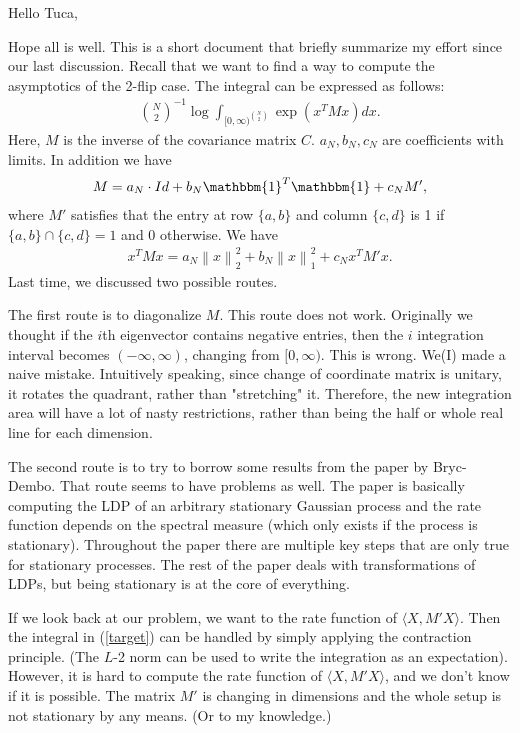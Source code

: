 \documentclass[10pt]{article}
\author{Yi Gu}
\newcommand{\norm}[1]{\left\lVert#1\right\rVert}
\newenvironment{Proof of lemma}{\noindent{\bf Proof of Lemma}}{\hfill$\Box$\newline}
\newenvironment{Proof of claim}{\noindent{\bf Proof of claim}}{\hfill$\Box$\newline}
\newenvironment{Proof of theorem}{\noindent{\bf Proof of Theorem}}{\hfill\scriptsize{$\Box$}\newline}
\newenvironment{Proof of theorems}{\noindent{\bf Proof of Theorems}}{\hfill$\Box$\newline}
\newenvironment{Proof of proposition}{\noindent{\bf Proof of Proposition}}{\hfill$\Box$\newline}
\newenvironment{Proof of propositions}{\noindent{\bf Proof of Propositions}}{\hfill$\Box$\newline}
\newenvironment{Proof of exercise}{\noindent{\it Proof of Exercise:}}{\hfill$\Box$}
\begin{document}
Hello Tuca,

Hope all is well. This is a short document that briefly summarize my effort since our last discussion. Recall that we want to find a way to compute the asymptotics of the 2-flip case. The integral can be expressed as follows:
\begin{align} \label{target}
    \binom{N}{2}^{-1}\log \int_{[0,\infty)^{\binom{N}{2}}} \exp \left(x^T M x\right)dx.
\end{align}
Here, $M$ is the inverse of the covariance matrix $C$. $a_N, b_N, c_N$ are coefficients with limits. In addition we have
\begin{align} 
    M = a_N\cdot Id + b_N \mathbbm{1}^T\mathbbm{1} + c_NM',
\end{align}
where $M'$ satisfies that the entry at row $\{a,b\}$ and column $\{c,d\}$ is 1 if $\{a,b\} \cap \{c,d\} = 1$ and 0 otherwise. We have
\begin{align}
    x^TMx = a_N\norm{x}_2^2 + b_N \norm{x}_1^2 + c_Nx^TM'x.
\end{align}
Last time, we discussed two possible routes. 

The first route is to diagonalize $M$. This route does not work. Originally we thought if the $i$th eigenvector contains negative entries, then the $i$ integration interval becomes $(-\infty,\infty)$, changing from $[0,\infty)$. This is wrong. We(I) made a naive mistake. Intuitively speaking, since change of coordinate matrix is unitary, it rotates the quadrant, rather than "stretching" it. Therefore, the new integration area will have a lot of nasty restrictions, rather than being the half or whole real line for each dimension.

The second route is to try to borrow some results from the paper by Bryc-Dembo. That route seems to have problems as well. The paper is basically computing the LDP of an arbitrary stationary Gaussian process and the rate function depends on the spectral measure (which only exists if the process is stationary). Throughout the paper there are multiple key steps that are only true for stationary processes. The rest of the paper deals with transformations of LDPs, but being stationary is at the core of everything.

If we look back at our problem, we want to the rate function of $\langle X, M'X \rangle$. Then the integral in (\ref{target}) can be handled by simply applying the contraction principle. (The $L$-2 norm can be used to write the integration as an expectation). However, it is hard to compute the rate function of $\langle X, M'X \rangle$, and we don't know if it is possible. The matrix $M'$ is changing in dimensions and the whole setup is not stationary by any means. (Or to my knowledge.)
\end{document}
